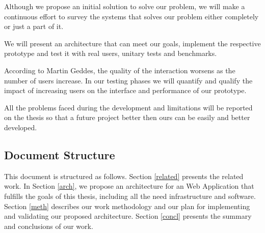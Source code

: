 
Although we propose an initial solution to solve our problem, we will make a continuous effort to survey the systems that solves our problem either completely or just a part of it.

We will present an architecture that can meet our goals, implement the respective prototype and test it with real users, unitary tests and benchmarks.

According to Martin Geddes, the quality of the interaction worsens as the number of users increase\cite{geddes}. In our testing phases we will quantify and qualify the impact of increasing users on the interface and performance of our prototype. 

	All the problems faced during the development and limitations will be reported on the thesis so that a future project better then ours can be easily and better developed.

\subsection{Document Structure} %
This document is structured as follows. Section \ref{related} presents the related work.
	In Section \ref{arch}, we propose an architecture for an Web Application that fulfills the goals of this thesis, including all the need infrastructure and software.
	Section \ref{meth} describes our work methodology and our plan for implementing and validating our proposed architecture.
	Section \ref{concl} presents the summary and conclusions of our work.

